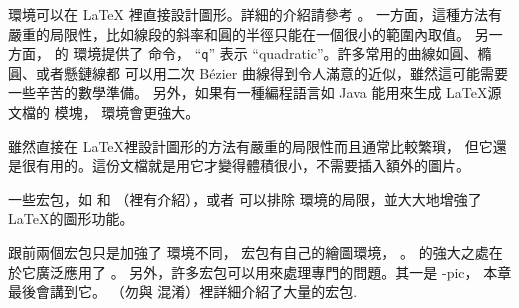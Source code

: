  環境可以在 \LaTeX{} 裡直接設計圖形。詳細的介紹請參考 \manual。
一方面，這種方法有嚴重的局限性，比如線段的斜率和圓的半徑只能在一個很小的範圍內取值。
另一方面， \LaTeXe 的  環境提供了  命令，
``\texttt{q}'' 表示 ``quadratic''。許多常用的曲線如圓、橢圓、或者懸鏈線都
可以用二次 B\'ezier 曲線得到令人滿意的近似，雖然這可能需要一些辛苦的數學準備。
另外，如果有一種編程語言如 Java 能用來生成 \LaTeX 源文檔的  模塊，
 環境會更強大。

%
%

雖然直接在 \LaTeX 裡設計圖形的方法有嚴重的局限性而且通常比較繁瑣，
但它還是很有用的。這份文檔就是用它才變得體積很小，不需要插入額外的圖片。

一些宏包，如  和 （\companion 裡有介紹），或者
  可以排除  環境的局限，並大大地增強了 \LaTeX 的圖形功能。

跟前兩個宏包只是加強了  環境不同， 宏包有自己的繪圖環境，
。  的強大之處在於它廣泛應用了 \PSi{}。
另外，許多宏包可以用來處理專門的問題。其一是 \texorpdfstring{\Xy}{Xy}-pic，
本章最後會講到它。
\graphicscompanion{} （勿與 \companion 混淆）裡詳細介紹了大量的宏包.
%

